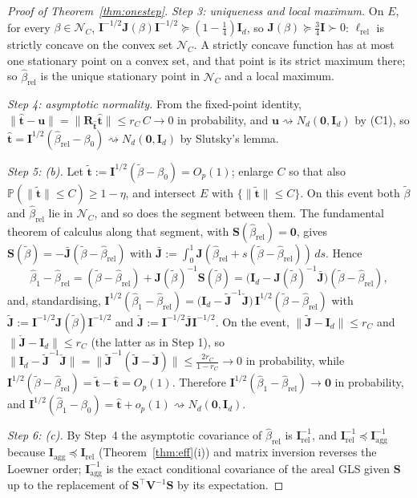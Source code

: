 \documentclass[11pt]{article}
\theoremstyle{definition}
\newcommand{\bS}{\mathbf{S}}
\newcommand{\bV}{\mathbf{V}}
\newcommand{\bI}{\mathbf{I}}
\newcommand{\bzero}{\mathbf{0}}
\newcommand{\Prob}{\mathbb{P}}
\newcommand{\rel}{\mathrm{rel}}
\newcommand{\agg}{\mathrm{agg}}
\begin{document}
\begin{proof}[Proof of Theorem~\ref{thm:onestep}]
\emph{Step 3: uniqueness and local maximum.} On $E$, for every $\beta\in\mathcal N_C$, $\mathbf I^{-1/2}\mathbf J(\beta)\mathbf I^{-1/2}\succeq(1-\tfrac14)\bI_d$, so $\mathbf J(\beta)\succeq\tfrac34\mathbf I\succ0$: $\ell_\rel$ is strictly concave on the convex set $\mathcal N_C$. A strictly concave function has at most one stationary point on a convex set, and that point is its strict maximum there; so $\hat\beta_\rel$ is the unique stationary point in $\mathcal N_C$ and a local maximum.

\emph{Step 4: asymptotic normality.} From the fixed-point identity, $\|\hat{\bm t}-\bm u\|=\|\mathbf R_{\hat{\bm t}}\hat{\bm t}\|\le r_C\,C\to0$ in probability, and $\bm u\rightsquigarrow N_d(\bzero,\bI_d)$ by (C1), so $\hat{\bm t}=\mathbf I^{1/2}(\hat\beta_\rel-\beta_0)\rightsquigarrow N_d(\bzero,\bI_d)$ by Slutsky's lemma.

\emph{Step 5: (b).} Let $\tilde{\bm t}:=\mathbf I^{1/2}(\tilde\beta-\beta_0)=O_p(1)$; enlarge $C$ so that also $\Prob(\|\tilde{\bm t}\|\le C)\ge1-\eta$, and intersect $E$ with $\{\|\tilde{\bm t}\|\le C\}$. On this event both $\tilde\beta$ and $\hat\beta_\rel$ lie in $\mathcal N_C$, and so does the segment between them. The fundamental theorem of calculus along that segment, with $\bS(\hat\beta_\rel)=\bzero$, gives $\bS(\tilde\beta)=-\bar{\mathbf J}(\tilde\beta-\hat\beta_\rel)$ with $\bar{\mathbf J}:=\int_0^1\mathbf J(\hat\beta_\rel+s(\tilde\beta-\hat\beta_\rel))\,ds$. Hence
\[
\hat\beta_1-\hat\beta_\rel=(\tilde\beta-\hat\beta_\rel)+\mathbf J(\tilde\beta)^{-1}\bS(\tilde\beta)=\big(\bI_d-\mathbf J(\tilde\beta)^{-1}\bar{\mathbf J}\big)(\tilde\beta-\hat\beta_\rel),
\]
and, standardising, $\mathbf I^{1/2}(\hat\beta_1-\hat\beta_\rel)=\big(\bI_d-\tilde{\mathbf J}^{-1}\check{\mathbf J}\big)\,\mathbf I^{1/2}(\tilde\beta-\hat\beta_\rel)$ with $\tilde{\mathbf J}:=\mathbf I^{-1/2}\mathbf J(\tilde\beta)\mathbf I^{-1/2}$ and $\check{\mathbf J}:=\mathbf I^{-1/2}\bar{\mathbf J}\mathbf I^{-1/2}$. On the event, $\|\tilde{\mathbf J}-\bI_d\|\le r_C$ and $\|\check{\mathbf J}-\bI_d\|\le r_C$ (the latter as in Step 1), so $\|\bI_d-\tilde{\mathbf J}^{-1}\check{\mathbf J}\|=\|\tilde{\mathbf J}^{-1}(\tilde{\mathbf J}-\check{\mathbf J})\|\le\frac{2r_C}{1-r_C}\to0$ in probability, while $\mathbf I^{1/2}(\tilde\beta-\hat\beta_\rel)=\tilde{\bm t}-\hat{\bm t}=O_p(1)$. Therefore $\mathbf I^{1/2}(\hat\beta_1-\hat\beta_\rel)\to\bzero$ in probability, and $\mathbf I^{1/2}(\hat\beta_1-\beta_0)=\hat{\bm t}+o_p(1)\rightsquigarrow N_d(\bzero,\bI_d)$.

\emph{Step 6: (c).} By Step~4 the asymptotic covariance of $\hat\beta_\rel$ is $\mathbf I_\rel^{-1}$, and $\mathbf I_\rel^{-1}\preceq\mathbf I_\agg^{-1}$ because $\mathbf I_\agg\preceq\mathbf I_\rel$ (Theorem~\ref{thm:eff}(i)) and matrix inversion reverses the Loewner order; $\mathbf I_\agg^{-1}$ is the exact conditional covariance of the areal GLS given $\mathbf S$ up to the replacement of $\mathbf S^\top\bV^{-1}\mathbf S$ by its expectation.


\end{proof}
\end{document}
